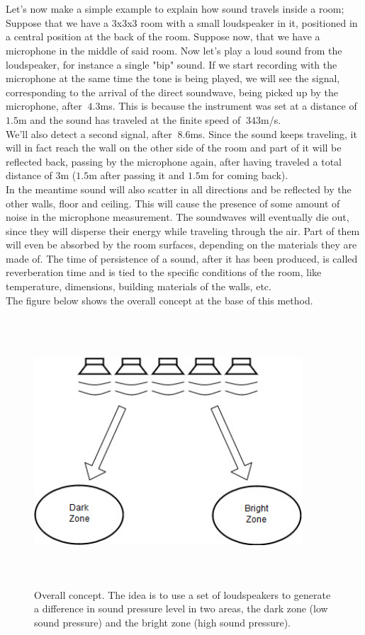 \\
\\
Let's now make a simple example to explain how sound travels inside a room; Suppose that we have a 3x3x3 room with a small loudspeaker in it, positioned in a central position at the back of the room. Suppose now, that we have a microphone in the middle of said room. Now let's play a loud sound from the loudspeaker, for instance a single "bip" sound. If we start recording with the microphone at the same time the tone is being played, we will see the signal, corresponding to the arrival of the direct soundwave, being picked up by the microphone, after $~4.3$ms. This is because the instrument was set at a distance of $1.5$m and the sound has traveled at the finite speed of $~343$m/s.
\\
We'll also detect a second signal, after $~8.6$ms. Since the sound keeps traveling, it will in fact reach the wall on the other side of the room and part of it will be reflected back, passing by the microphone again, after having traveled a total distance of $3$m ($1.5$m after passing it and $1.5$m for coming back).
\\
In the meantime sound will also scatter in all directions and be reflected by the other walls, floor and ceiling. This will cause the presence of some amount of noise in the microphone measurement. The soundwaves will eventually die out, since they will disperse their energy while traveling through the air. Part of them will even be absorbed by the room surfaces, depending on the materials they are made of. The time of persistence of a sound, after it has been produced, is called reverberation time and is tied to the specific conditions of the room, like temperature, dimensions, building materials of the walls, etc.
\\
The figure below shows the overall concept at the base of this method.

\begin{figure}[H]
\centering
\includegraphics[width=10cm,height=10cm,keepaspectratio]{Figures/concept}
\decoRule
\caption[concept]{Overall concept. The idea is to use a set of loudspeakers to generate a difference in sound pressure level in two areas, the dark zone (low sound pressure) and the bright zone (high sound pressure). }
\label{fig:concept}
\end{figure}

